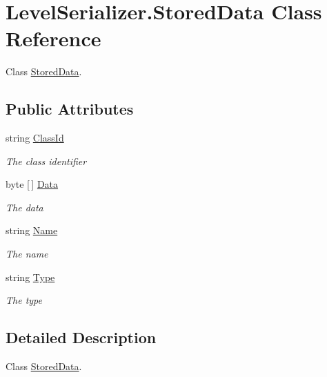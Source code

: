 \hypertarget{class_level_serializer_1_1_stored_data}{}\section{Level\+Serializer.\+Stored\+Data Class Reference}
\label{class_level_serializer_1_1_stored_data}


Class \hyperlink{class_level_serializer_1_1_stored_data}{Stored\+Data}.  


\subsection*{Public Attributes}
\begin{DoxyCompactItemize}
\item 
string \hyperlink{class_level_serializer_1_1_stored_data_a0ab54247f9b48b18670bfe8e2ce69e36}{Class\+Id}
\begin{DoxyCompactList}\small\item\em The class identifier \end{DoxyCompactList}\item 
byte \mbox{[}$\,$\mbox{]} \hyperlink{class_level_serializer_1_1_stored_data_a5fcb63be7929e28ef3ed5049f51f5d90}{Data}
\begin{DoxyCompactList}\small\item\em The data \end{DoxyCompactList}\item 
string \hyperlink{class_level_serializer_1_1_stored_data_acd037ada2df660fcd362ca653762579c}{Name}
\begin{DoxyCompactList}\small\item\em The name \end{DoxyCompactList}\item 
string \hyperlink{class_level_serializer_1_1_stored_data_afb1907084ca13d38d47d397f1a0cddd2}{Type}
\begin{DoxyCompactList}\small\item\em The type \end{DoxyCompactList}\end{DoxyCompactItemize}


\subsection{Detailed Description}
Class \hyperlink{class_level_serializer_1_1_stored_data}{Stored\+Data}. 



